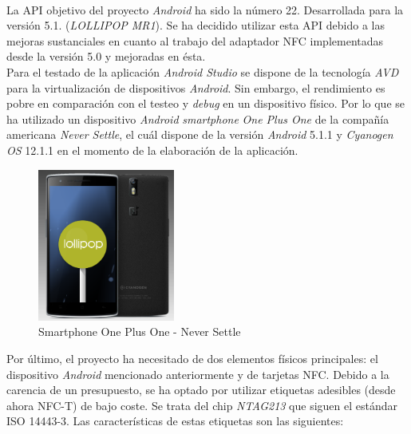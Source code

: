 \documentclass[../PFC.tex]{subfiles}
\begin{document}
\*
\vspace{0.5515cm}
\\
La API objetivo del proyecto \textit{Android} ha sido la número 22. Desarrollada para la versión 5.1. (\textit{LOLLIPOP MR1}). Se ha decidido utilizar esta API debido a las mejoras sustanciales en cuanto al trabajo del adaptador NFC implementadas desde la versión 5.0\cite{androidAPI21} y mejoradas en ésta\cite{androidAPI22}. 
\*
\vspace{0.5515cm}
\\
Para el testado de la aplicación \textit{Android Studio} se dispone de la tecnología \textit{AVD} para la virtualización de dispositivos \textit{Android}. Sin embargo, el rendimiento es pobre en comparación con el testeo y \textit{debug} en un dispositivo físico. Por lo que se ha utilizado un dispositivo \textit{Android} \textit{smartphone} \textit{One Plus One} de la compañía americana \textit{Never Settle}, el cuál dispone de la versión \textit{Android} 5.1.1 y \textit{Cyanogen OS} 12.1.1  en el momento de la elaboración de la aplicación. 

\begin{figure}[H]
  \centering
  \includegraphics[width=0.4\textwidth]{./img/opo}
  \caption{Smartphone One Plus One - Never Settle}
  \label{img:opo}
\end{figure} 

Por último, el proyecto ha necesitado de dos elementos físicos principales: el dispositivo \textit{Android} mencionado anteriormente y de tarjetas NFC. Debido a la carencia de un presupuesto, se ha optado por utilizar etiquetas adesibles (desde ahora NFC-T) de bajo coste. Se trata del chip \textit{NTAG213} que siguen el estándar ISO 14443-3\cite{iso14443}. Las características de estas etiquetas son las siguientes:
\end{document}

